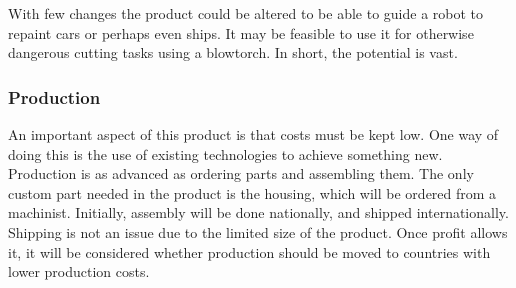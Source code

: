 With few changes the product could be altered to be able to guide a robot to repaint cars or perhaps even ships. It may be feasible to use it for otherwise dangerous cutting tasks using a blowtorch. In short, the potential is vast.

\subsubsection{Production}
An important aspect of this product is that costs must be kept low. One way of doing this is the use of existing technologies to achieve something new. Production is as advanced as ordering parts and assembling them. The only custom part needed in the product is the housing, which will be ordered from a machinist. Initially, assembly will be done nationally, and shipped internationally. Shipping is not an issue due to the limited size of the product. Once profit allows it, it will be considered whether production should be moved to countries with lower production costs.
